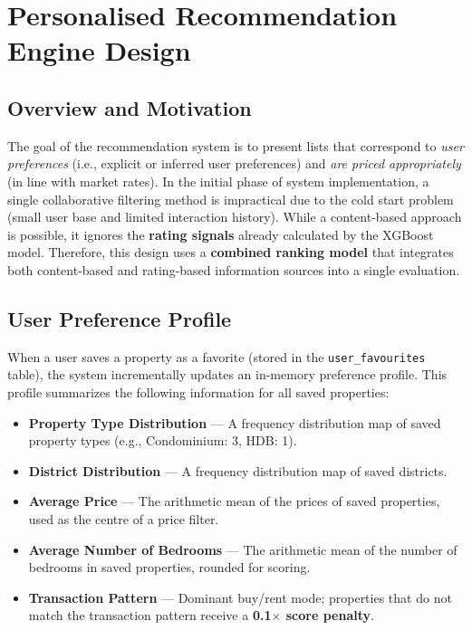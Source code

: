 \section{Personalised Recommendation Engine Design}
\label{sec:rec_design}

\subsection{Overview and Motivation}

The goal of the recommendation system is to present lists that correspond to 
\emph{user preferences} (i.e., explicit or inferred user preferences) and 
\emph{are priced appropriately} (in line with market rates). In the initial phase 
of system implementation, a single collaborative filtering method is impractical 
due to the cold start problem (small user base and limited interaction history). 
While a content-based approach is possible, it ignores the \textbf{rating signals} 
already calculated by the XGBoost model. Therefore, this design uses a 
\textbf{combined ranking model} that integrates both content-based and 
rating-based information sources into a single evaluation.

\subsection{User Preference Profile}

When a user saves a property as a favorite (stored in the \texttt{user\_favourites} table), the system incrementally updates an in-memory preference profile. This profile summarizes the following information for all saved properties:

\begin{itemize}
\item \textbf{Property Type Distribution} — A frequency distribution map of saved property types (e.g., {Condominium: 3, HDB: 1}).
\item \textbf{District Distribution} — A frequency distribution map of saved districts.
\item \textbf{Average Price} — The arithmetic mean of the prices of saved properties, used as the centre of a price filter.
\item \textbf{Average Number of Bedrooms} — The arithmetic mean of the number of bedrooms in saved properties, rounded for scoring.
\item \textbf{Transaction Pattern} — Dominant buy/rent mode; properties that do not match the transaction pattern receive a \textbf{0.1$\times$ score penalty}.
\end{itemize}

